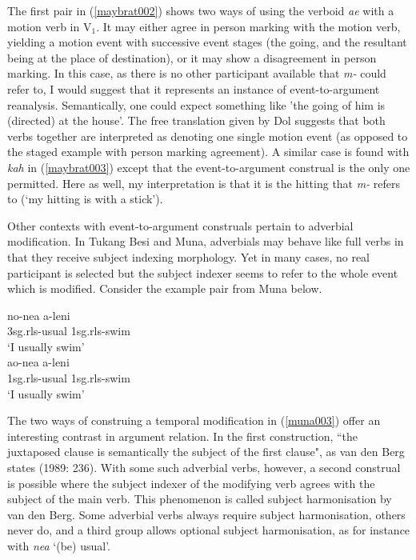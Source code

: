 The first pair in (\ref{maybrat002}) shows two ways of using the verboid \textit{ae} with a motion verb in V$_1$. It may either agree in person marking with the motion verb, yielding a motion event with successive event stages (the going, and the resultant being at the place of destination), or it may show a disagreement in person marking. In this case, as there is no other participant available that \textit{m-} could refer to, I would suggest that it represents an instance of event-to-argument reanalysis. Semantically, one could expect something like 'the going of him is (directed) at the house'. The free translation given by Dol suggests that both verbs together are interpreted as denoting one single motion event (as opposed to the staged example with person marking agreement). A similar case is found with \textit{kah} in (\ref{maybrat003}) except that the event-to-argument construal is the only one permitted. Here as well, my interpretation is that it is the hitting that \textit{m-} refers to (`my hitting is with a stick').

Other contexts with event-to-argument construals pertain to adverbial modification. In Tukang Besi and Muna, adverbials may behave like full verbs in that they receive subject indexing morphology. Yet in many cases, no real participant is selected but the subject indexer seems to refer to the whole event which is modified. Consider the example pair from Muna below.

\pex \label{muna003}
\a
\gll no-nea a-leni \\
3\acs{sg}.\acs{rls}-usual 1\acs{sg}.\acs{rls}-swim \\
\glft `I usually swim' \\ 
\z
\a
\gll ao-nea a-leni \\ 
1\acs{sg}.\acs{rls}-usual 1\acs{sg}.\acs{rls}-swim \\
\glft `I usually swim' \\ 
\z
\xe

The two ways of construing a temporal modification in (\ref{muna003}) offer an interesting contrast in argument relation. In the first construction, ``the juxtaposed clause is semantically the subject of the first clause", as van den Berg states (1989: 236). With some such adverbial verbs, however, a second construal is possible where the subject indexer of the modifying verb agrees with the subject of the main verb. This phenomenon is called subject harmonisation by van den Berg. Some adverbial verbs always require subject harmonisation, others never do, and a third group allows optional subject harmonisation, as for instance with \textit{nea} `(be) usual'.

